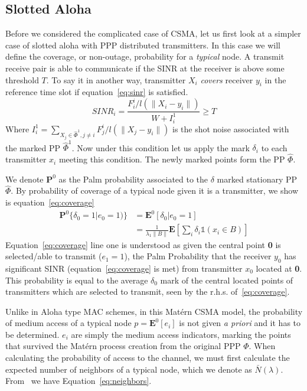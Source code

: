 \documentclass[a4paper]{article}
\begin{document}
\subsection{Slotted Aloha}
%
Before we considered the complicated case of CSMA, let us first look at a simpler case of slotted aloha with PPP distributed transmitters.  In this case we will define the coverage, or non-outage, probability for a \textit{typical} node.  A transmit receive pair is able to communicate if the SINR at the receiver is above some threshold $T$.  To say it in another way, transmitter $X_i$ \textit{covers} receiver $y_i$ in the reference time slot if equation~\eqref{eq:sinr} is satisfied.
%
\begin{equation}\label{eq:sinr}
  SINR_i = \frac{F_i^i/l(\|X_i - y_i\|)}{W + I_i^1} \geq T
\end{equation}
%
Where $I_i^1 = \sum_{X_j \in \hat{\Phi}^1,j \neq i} F_j^i/l(\|X_j-y_i\|) $ is the shot noise associated with the marked PP $\hat{\Phi}^1$. Now under this condition let us apply the mark $\delta_i$ to each transmitter $x_i$ meeting this condition.  The newly marked points form the PP $\hat{\Phi}$.
%
%
\par
%
We denote $\textbf{P}^0$ as the Palm probability associated to the $\delta$ marked stationary PP $\hat{\Phi}$.  By probability of coverage of a typical node given it is a transmitter, we show is equation~\eqref{eq:coverage}
%
\begin{equation}\label{eq:coverage}
  \begin{split}
  \textbf{P}^0\{\delta_0=1|e_0=1)\} &= \textbf{E}^0[\delta_0|e_0=1] \\
  &= \frac{1}{\lambda_1\|B\|}\textbf{E}[\sum_i \delta_i \mathbb{1}(x_i \in B)]
\end{split}
\end{equation}
%
Equation~\eqref{eq:coverage} line one is understood as given the central point \textbf{0} is selected/able to transmit ($e_1=1$), the Palm Probability that the receiver $y_0$ has significant SINR (equation~\eqref{eq:coverage} is met) from transmitter $x_0$ located at \textbf{0}.  This probability is equal to the average $\delta_0$ mark of the central located points of transmitters which are selected to transmit, seen by the r.h.s. of~\eqref{eq:coverage}.\par
%
Unlike in Aloha type MAC schemes, in this Mat\'ern CSMA model, the probability of medium access of a typical node $p = \textbf{E}^0[e_i]$ is not given \textit{a priori} and it has to be determined.  $e_i$ are simply the medium access indicators, marking the points that survived the Mat\'ern process creation from the original PPP $\Phi$.  When calculating the probability of access to the channel, we must first calculate the expected number of neighbors of a typical node, which we denote as $\bar{N}(\lambda)$.  From~\cite{baccelli2009stochasticVII} we have Equation~\eqref{eq:neighbors}.
\end{document}
